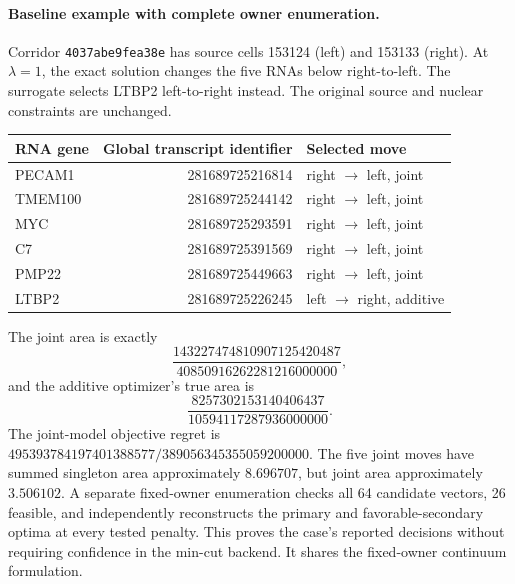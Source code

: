 \documentclass[10pt,letterpaper]{article}
\begin{document}
\paragraph{Baseline example with complete owner enumeration.}
Corridor \texttt{4037abe9fea38e} has source cells 153124 (left) and 153133 (right). At $\lambda=1$, the exact solution changes the five RNAs below right-to-left. The surrogate selects LTBP2 left-to-right instead. The original source and nuclear constraints are unchanged.
\begin{center}
\begin{tabular}{lrl}\toprule
RNA gene & Global transcript identifier & Selected move\\\midrule
PECAM1 &281689725216814&right $\to$ left, joint\\
TMEM100 &281689725244142&right $\to$ left, joint\\
MYC &281689725293591&right $\to$ left, joint\\
C7 &281689725391569&right $\to$ left, joint\\
PMP22 &281689725449663&right $\to$ left, joint\\
LTBP2 &281689725226245&left $\to$ right, additive\\\bottomrule
\end{tabular}
\end{center}
The joint area is exactly
\[
\frac{143227474810907125420487}{40850916262281216000000},
\]
and the additive optimizer's true area is
\[
\frac{8257302153140406437}{10594117287936000000}.
\]
The joint-model objective regret is
$495393784197401388577/389056345355059200000$.
The five joint moves have summed singleton area approximately $8.696707$, but joint area approximately $3.506102$. A separate fixed-owner enumeration checks all 64 candidate vectors, 26 feasible, and independently reconstructs the primary and favorable-secondary optima at every tested penalty. This proves the case's reported decisions without requiring confidence in the min-cut backend. It shares the fixed-owner continuum formulation.
\end{document}
